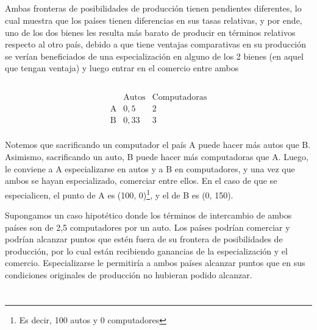 \documentclass[11pt,a4paper]{article} %
\begin{document}
\subsection{}

\noindent Ambas fronteras de posibilidades de producción tienen pendientes diferentes, lo cual muestra que los países tienen diferencias en sus tasas relativas, y por ende, uno de los dos bienes les resulta más barato de producir en términos relativos respecto al otro país, debido a que tiene ventajas comparativas en su producción se verían beneficiados de una especialización en alguno de los 2 bienes (en aquel que tengan ventaja) y luego entrar en el comercio entre ambos


\subsection{}

\[
\begin{array}{c|cc}
    & \text{Autos} & \text{Computadoras} \\ \hline
    \text{A} & 0,5 & 2 \\
    \text{B} & 0,33 & 3 \\
\end{array}
\]

\noindent Notemos que sacrificando un computador el país A puede hacer más autos que B. Asimismo, sacrificando un auto, B puede hacer más computadoras que A. Luego, le conviene a A especializarse en autos y a B en computadores, y una vez que ambos se hayan especializado, comerciar entre ellos. En el caso de que se especialicen, el punto de A es (100, 0)\footnote{Es decir, 100 autos y 0 computadores}, y el de B es (0, 150). 

Supongamos un caso hipotético donde los términos de intercambio de ambos países son de 2,5 computadores por un auto. Los países podrían comerciar y podrían alcanzar puntos que estén fuera de su frontera de posibilidades de producción, por lo cual están recibiendo ganancias de la especialización y el comercio. Especializarse le permitiría a ambos países alcanzar puntos que en sus condiciones originales de producción no hubieran podido alcanzar. 


\section{}

\subsection{}
\end{document}

